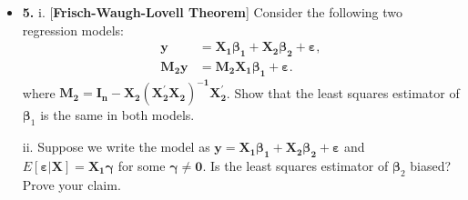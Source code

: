 \documentclass[a4paper]{ctexart}
\theoremstyle{remark}
\begin{document}
\begin{itemize}
\item \textbf{5.} i. [\textbf{Frisch-Waugh-Lovell Theorem}] Consider the following two regression models:
\begin{align}
\bm{y}&=\bm{X_1\beta_1+X_2\beta_2+\varepsilon},\\
\bm{M_2y}& = \bm{M_2X_1\beta_1 + \varepsilon}.
\end{align}
where $\bm{M_2 = I_n-X_2(X_2^{'}X_2)^{-1}X_2^{'}}$. Show that the least squares estimator of $\bm\beta_1$ is the same in both models.

ii. Suppose we write the model as $\bm{y}=\bm{X_1\beta_1+X_2\beta_2+\varepsilon}$ and $E[\bm\varepsilon|\bm{X}] = \bm{X_1\gamma}$ for some $\bm{\gamma\neq 0}$. Is the least squares estimator of $\bm\beta_2$  biased? Prove your claim.
\fi

\end{itemize}
\end{document}
